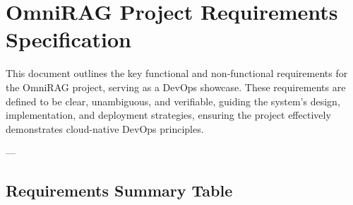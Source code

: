 \documentclass[a4paper,10pt]{article}
\begin{document}
\section*{OmniRAG Project Requirements Specification}
This document outlines the key functional and non-functional requirements for the OmniRAG project, serving as a DevOps showcase. These requirements are defined to be clear, unambiguous, and verifiable, guiding the system's design, implementation, and deployment strategies, ensuring the project effectively demonstrates cloud-native DevOps principles.

---

\subsection*{Requirements Summary Table}
\end{document}

